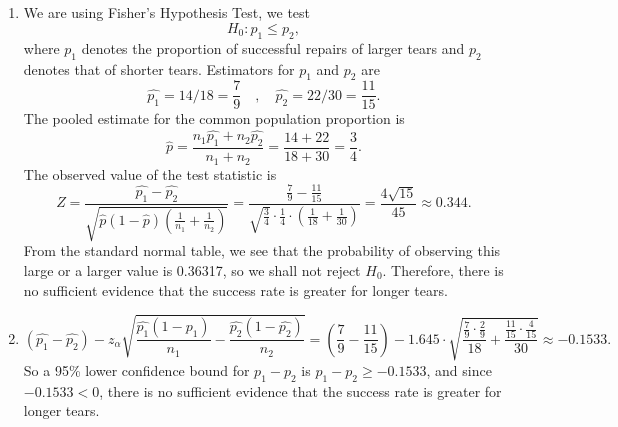 \documentclass[11pt,a4paper]{article}
\begin{document}
\subsection{}
\begin{enumerate}[label=\roman*)]
\item
We are using Fisher’s Hypothesis Test, we test $$H_0:p_1\leqslant p_2,$$
where $p_1$ denotes the proportion of successful repairs of larger tears and $p_2$ denotes that of shorter tears. Estimators for $p_1$ and $p_2$ are $$\hat{p_1}=14/18=\frac{7}{9}\quad,\quad\hat{p_2}=22/30=\frac{11}{15}.$$
The pooled estimate for the common population proportion is
$$\hat{p}=\frac{n_1\hat{p_1}+n_2\hat{p_2}}{n_1+n_2}=\frac{14+22}{18+30}=\frac{3}{4}.$$
The observed value of the test statistic is
$$Z=\frac{\hat{p_1}-\hat{p_2}}{\sqrt{\hat{p}(1-\hat{p})\left(\frac{1}{n_1}+\frac{1}{n_2}\right)}}=\frac{\frac{7}{9}-\frac{11}{15}}{\sqrt{\frac{3}{4}}\cdot\frac{1}{4}\cdot\left(\frac{1}{18}+\frac{1}{30}\right)}=\frac{4\sqrt{15}}{45}\approx0.344.$$
From the standard normal table, we see that the probability of observing
this large or a larger value is 0.36317, so we shall not reject $H_0$. Therefore, there is no sufficient evidence that the success rate is greater for longer tears.
\item
$$(\hat{p_1}-\hat{p_2})-z_{\alpha}\sqrt{\frac{\hat{p_1}(1-\hat{p_1})}{n_1}-\frac{\hat{p_2}(1-\hat{p_2})}{n_2}}=\left(\frac{7}{9}-\frac{11}{15}\right)-1.645\cdot\sqrt{\frac{\frac{7}{9}\cdot\frac{2}{9}}{18}+\frac{\frac{11}{15}\cdot\frac{4}{15}}{30}}\approx-0.1533.$$
So a 95\% lower confidence bound for $p_1-p_2$ is $p_1-p_2\geqslant -0.1533$, and since $-0.1533<0$, there is no sufficient evidence that the success rate is greater for longer tears.
\end{enumerate}

\subsection{}
\end{document}

